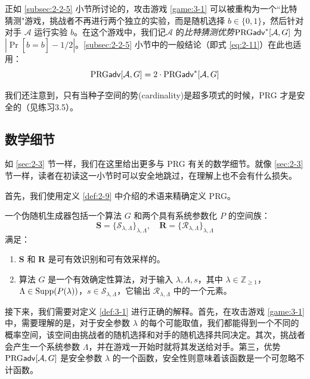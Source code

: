 正如 \ref{subsec:2-2-5} 小节所讨论的，攻击游戏 \ref{game:3-1} 可以被重构为一个``比特猜测"游戏，挑战者不再进行两个独立的实验，而是随机选择 $b\in\{0,1\}$，然后针对对手 $\mathcal{A}$ 运行实验 $b$。在这个游戏中，我们记$\mathcal{A}$ 的\emph{比特猜测优势}${\rm PRG\mathsf{adv}}^*[\mathcal{A},G]$ 为 $|\Pr[\hat b=b]-{1}/{2}|$。\ref{subsec:2-2-5} 小节中的一般结论（即式 \ref{eq:2-11}）在此也适用：
\begin{equation}
{\rm PRG\mathsf{adv}}[\mathcal{A},G]=2\cdot{\rm PRG\mathsf{adv}}^*[\mathcal{A},G]
\end{equation}

我们还注意到，只有当种子空间的势(cardinality)是超多项式的时候，PRG 才是安全的（见练习3.5）。

\subsection{数学细节}

如 \ref{sec:2-3} 节一样，我们在这里给出更多与 PRG 有关的数学细节。就像 \ref{sec:2-3} 节一样，读者在初读这一小节时可以安全地跳过，在理解上也不会有什么损失。

首先，我们使用定义 \ref{def:2-9} 中介绍的术语来精确定义 PRG。

\begin{definition}[伪随机生成器]
一个伪随机生成器包括一个算法 $G$ 和两个具有系统参数化 $P$ 的空间族：
$$
\mathbf{S}=\{\mathcal{S}_{\lambda,\Lambda}\}_{\lambda,\Lambda},\quad
\mathbf{R}=\{\mathcal{R}_{\lambda,\Lambda}\}_{\lambda,\Lambda}
$$
满足：
\begin{enumerate}
	\item $\mathbf{S}$ 和 $\mathbf{R}$ 是可有效识别和可有效采样的。
	\item 算法 $G$ 是一个有效确定性算法，对于输入 $\lambda,\Lambda,s$，其中 $\lambda\in\mathbb{Z}_{\geq1}$，$\Lambda\in{\rm Supp}(P(\lambda))$，$s\in\mathcal{S}_{\lambda,\Lambda}$，它输出 $\mathcal{R}_{\lambda,\Lambda}$ 中的一个元素。
\end{enumerate}
\end{definition}

接下来，我们需要对定义 \ref{def:3-1} 进行正确的解释。首先，在攻击游戏 \ref{game:3-1} 中，需要理解的是，对于安全参数 $\lambda$ 的每个可能取值，我们都能得到一个不同的概率空间，该空间由挑战者的随机选择和对手的随机选择共同决定。其次，挑战者会产生一个系统参数 $\Lambda$，并在游戏一开始时就将其发送给对手。第三，优势 ${\rm PRG\mathsf{adv}}[\mathcal{A},G]$ 是安全参数 $\lambda$ 的一个函数，安全性则意味着该函数是一个可忽略不计函数。